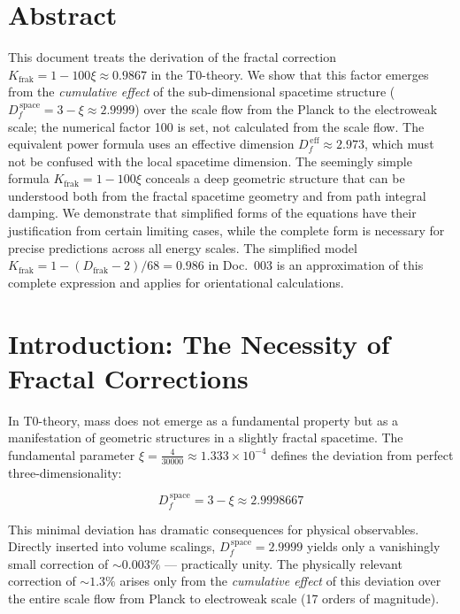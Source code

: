 \section*{Abstract}
		This document treats the derivation of the fractal correction $K_{\text{frak}} = 1 - 100\xi \approx 0.9867$ in the T0-theory. We show that this factor emerges from the \emph{cumulative effect} of the sub-dimensional spacetime structure ($D_f^{\,\text{space}} = 3 - \xi \approx 2.9999$) over the scale flow from the Planck to the electroweak scale; the numerical factor 100 is set, not calculated from the scale flow. The equivalent power formula uses an effective dimension $D_f^{\,\text{eff}} \approx 2.973$, which must not be confused with the local spacetime dimension. The seemingly simple formula $K_{\text{frak}} = 1 - 100\xi$ conceals a deep geometric structure that can be understood both from the fractal spacetime geometry and from path integral damping. We demonstrate that simplified forms of the equations have their justification from certain limiting cases, while the complete form is necessary for precise predictions across all energy scales. The simplified model $K_{\text{frak}} = 1 - (D_{\text{frak}}-2)/68 = 0.986$ in Doc.~003 is an approximation of this complete expression and applies for orientational calculations.

	
	
	\section{Introduction: The Necessity of Fractal Corrections}
	
	In T0-theory, mass does not emerge as a fundamental property but as a manifestation of geometric structures in a slightly fractal spacetime. The fundamental parameter $\xi = \frac{4}{30000} \approx 1.333 \times 10^{-4}$ defines the deviation from perfect three-dimensionality:
	
	\begin{equation}
		D_f^{\,\text{space}} = 3 - \xi \approx 2.9998667
		\label{eq:Df_def}
	\end{equation}
	
	This minimal deviation has dramatic consequences for physical observables. Directly inserted into volume scalings, $D_f^{\,\text{space}} = 2.9999$ yields only a vanishingly small correction of $\sim 0.003\%$ --- practically unity. The physically relevant correction of $\sim 1.3\%$ arises only from the \emph{cumulative effect} of this deviation over the entire scale flow from Planck to electroweak scale (17 orders of magnitude).
	
